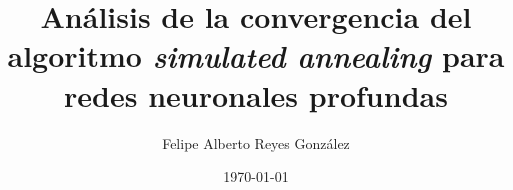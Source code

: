 \documentclass[informe]{tesis-usach}
\title{Análisis de la convergencia del algoritmo {\em simulated annealing} para redes neuronales profundas}
\author{Felipe Alberto Reyes González}
\date{\today}
\begin{document}
\renewcommand{\contentsname}{Tabla de contenido}
\renewcommand{\refname}{Bibliografía}
\renewcommand{\appendixname}{Apéndice}
\renewcommand{\appendixtocname}{Apéndices}
\renewcommand{\appendixpagename}{Apéndices}
\renewcommand{\tablename}{Tabla}


\maketitle

%
\tableofcontents
\newpage






%


\newpage


% 


%
%

\end{document}
